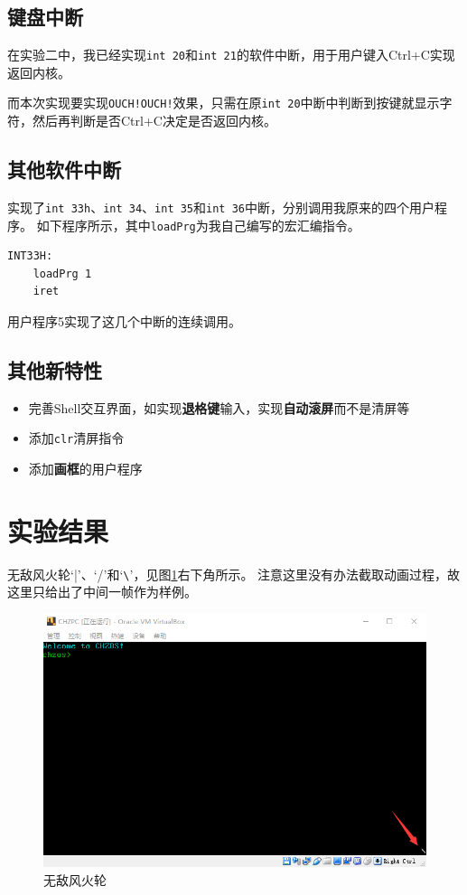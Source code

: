 \documentclass[logo,reportComp]{thesis}
\begin{document}
\subsection{键盘中断}
在实验二中，我已经实现\verb'int 20'和\verb'int 21'的软件中断，用于用户键入Ctrl+C实现返回内核。

而本次实现要实现\verb'OUCH!OUCH!'效果，只需在原\verb'int 20'中断中判断到按键就显示字符，然后再判断是否Ctrl+C决定是否返回内核。

\subsection{其他软件中断}
实现了\verb'int 33h'、\verb'int 34'、\verb'int 35'和\verb'int 36'中断，分别调用我原来的四个用户程序。
如下程序所示，其中\verb'loadPrg'为我自己编写的宏汇编指令。
\begin{lstlisting}[language={[x86masm]Assembler}]
INT33H:
    loadPrg 1
    iret
\end{lstlisting}

用户程序5实现了这几个中断的连续调用。

\subsection{其他新特性}
\begin{itemize}
	\item 完善Shell交互界面，如实现\textbf{退格键}输入，实现\textbf{自动滚屏}而不是清屏等
	\item 添加\verb'clr'清屏指令
	\item 添加\textbf{画框}的用户程序
\end{itemize}

\section{实验结果}
无敌风火轮`|'、`/'和`\verb'\''，见图\ref{fig:wheel}右下角所示。
注意这里没有办法截取动画过程，故这里只给出了中间一帧作为样例。
\begin{figure}[H]
\centering
\includegraphics[width=0.8\linewidth]{fig/wheel.PNG}
\caption{无敌风火轮}
\label{fig:wheel}
\end{figure}
\end{document}
